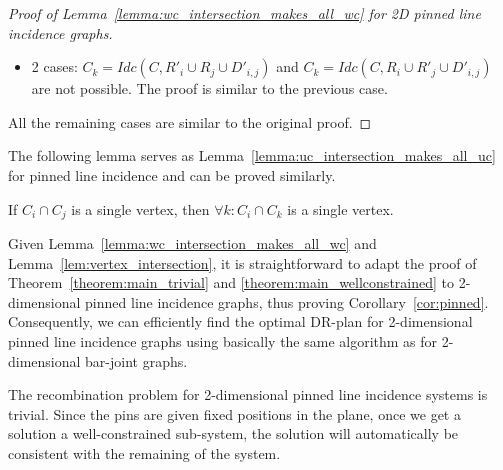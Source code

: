 \begin{proof}[Proof of Lemma~\ref{lemma:wc_intersection_makes_all_wc} for 2D pinned line incidence graphs]
\begin{itemize}
    \item 2 cases: $C_k=Idc(C,R'_i\cup R_j\cup D'_{i,j})$ and $C_k=Idc(C,R_i\cup R'_j\cup D'_{i,j})$ are not possible.
    The proof is similar to the previous case.
\end{itemize}

All the remaining cases are similar to the original proof.

\end{proof}


The following lemma serves as Lemma~\ref{lemma:uc_intersection_makes_all_uc} for pinned line incidence and can be proved similarly.
\begin{lemma}
\label{lem:vertex_intersection}
If $C_i\cap C_j$ is a single vertex, then $\forall k: C_i\cap C_k$ is a single vertex.
\end{lemma}

Given Lemma~\ref{lemma:wc_intersection_makes_all_wc} and Lemma~\ref{lem:vertex_intersection},
it is straightforward to adapt the proof of Theorem~\ref{theorem:main_trivial} and \ref{theorem:main_wellconstrained}
to  2-dimensional pinned line incidence graphs,
thus proving Corollary~\ref{cor:pinned}.
Consequently, we can efficiently find the optimal DR-plan for 2-dimensional pinned line incidence graphs using basically the same algorithm as for 2-dimensional bar-joint graphs.

The recombination problem for 2-dimensional pinned line incidence systems is trivial.
Since the pins are given fixed positions in the plane,
once we get a solution a well-constrained sub-system,
the solution will automatically be consistent with the remaining of the system.

